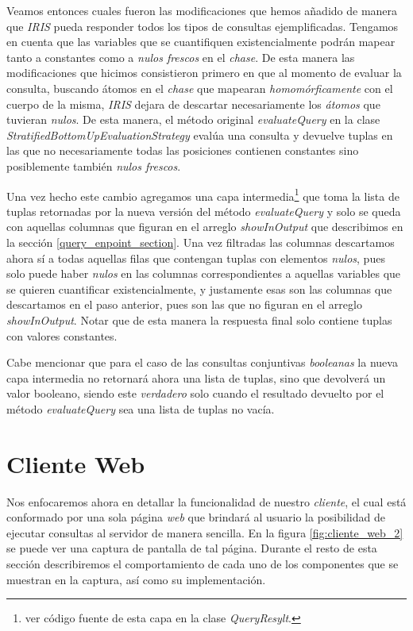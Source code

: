 \documentclass[11pt,a4paper,twoside]{tesis}
\begin{document}
Veamos entonces cuales fueron las modificaciones que hemos añadido de manera que \textit{IRIS} pueda responder todos los tipos de consultas ejemplificadas. Tengamos en cuenta que las variables que se cuantifiquen existencialmente podrán mapear tanto a constantes como a \textit{nulos frescos} en el \textit{chase}. De esta manera las modificaciones que hicimos consistieron primero en que al momento de evaluar la consulta, buscando átomos en el \textit{chase} que mapearan \textit{homomórficamente}   con el cuerpo de la misma, \textit{IRIS} dejara de descartar necesariamente los \textit{átomos} que tuvieran \textit{nulos}. De esta manera, el método original \textit{evaluateQuery} en la clase \textit{StratifiedBottomUpEvaluationStrategy} evalúa una consulta y devuelve tuplas en las que no necesariamente todas las posiciones contienen constantes sino posiblemente también \textit{nulos frescos}.

Una vez hecho este cambio agregamos una capa intermedia\footnote{ver código fuente de esta capa en la clase \textit{QueryResylt}.} que toma la lista de tuplas retornadas por la nueva versión del método \textit{evaluateQuery} y solo se queda con aquellas columnas que figuran en el arreglo \textit{showInOutput} que describimos en la sección \ref{query_enpoint_section}. Una vez filtradas las columnas descartamos ahora sí a todas aquellas filas que contengan tuplas con elementos \textit{nulos}, pues solo puede haber \textit{nulos} en las columnas correspondientes a aquellas variables que se quieren cuantificar existencialmente, y justamente esas son las columnas que descartamos en el paso anterior, pues son las que no figuran en el arreglo \textit{showInOutput}. Notar que de esta manera la respuesta final solo contiene tuplas con valores constantes.

Cabe mencionar que para el caso de las consultas conjuntivas \textit{booleanas} la nueva capa intermedia no retornará ahora una lista de tuplas, sino que devolverá un valor booleano, siendo este \textit{verdadero} solo cuando el resultado devuelto por el método \textit{evaluateQuery} sea una lista de tuplas no vacía.

\section{Cliente Web}

Nos enfocaremos ahora en detallar la funcionalidad de nuestro \textit{cliente}, el cual está conformado por una sola página \textit{web} que brindará al usuario la posibilidad de ejecutar consultas al servidor de manera sencilla. En la figura \ref{fig:cliente_web_2} se puede ver una captura de pantalla de tal página. Durante el resto de esta sección describiremos el comportamiento de cada uno de los componentes que se muestran en la captura, así como su implementación.
\end{document}
